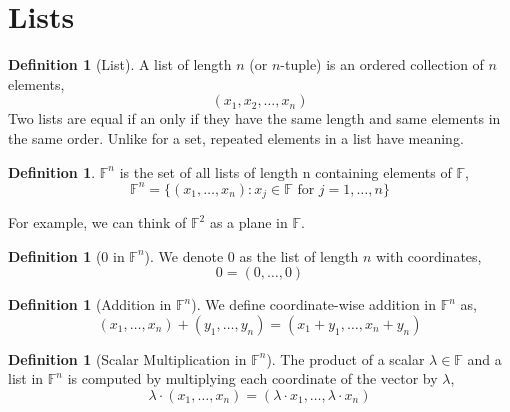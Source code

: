 \documentclass[12pt]{report}
\numberwithin{equation}{section}
\theoremstyle{definition}
\newtheorem{definition}[theorem]{Definition}
\begin{document}
\section{Lists}

\begin{definition}[List]
	A list of length $ n $ (or $ n$-tuple) is an ordered collection of $ n $ elements,
	\begin{equation}
			(x_1, x_2, \dots, x_n)
	\end{equation}
	Two lists are equal if an only if they have the same length and same elements in the same order. Unlike for a set, repeated elements in a list have meaning. 
\end{definition}

\begin{definition}
	$ \mathbb{F}^n $ is the set of all lists of length n containing elements of $ \mathbb{F} $,
	\begin{equation}
			\mathbb{F}^n = \{(x_1,\dots,x_n) : x_j\in \mathbb{F} \text{ for } j = 1, \dots, n\}
	\end{equation}
\end{definition}
For example, we can think of $ \mathbb{F}^2 $ as a plane in $ \mathbb{F} $.

\begin{definition}[0 in $ \mathbb{F}^n $]
	We denote 0 as the list of length $ n $ with coordinates,
	\begin{equation}
			0 = (0,\dots,0)
	\end{equation}
\end{definition}

\begin{definition}[Addition in $ \mathbb{F}^n $]
	We define coordinate-wise addition in $ \mathbb{F}^n $ as,
	\begin{equation}
			(x_1, \dots, x_n) + (y_1, \dots, y_n) = (x_1+y_1, \dots, x_n+y_n)
	\end{equation}
	\label{def:addition_fn}
\end{definition}

\begin{definition}[Scalar Multiplication in $ \mathbb{F}^n$]
	The product of a scalar $ \lambda\in \mathbb{F} $ and a list in $ \mathbb{F}^n $ is computed by multiplying each coordinate of the vector by $ \lambda $,
	\begin{equation}
			\lambda\cdot(x_1, \dots, x_n) = (\lambda\cdot x_1, \dots, \lambda\cdot x_n)
	\end{equation}
	\label{def:multiplication_fn}
\end{definition}
\end{document}
